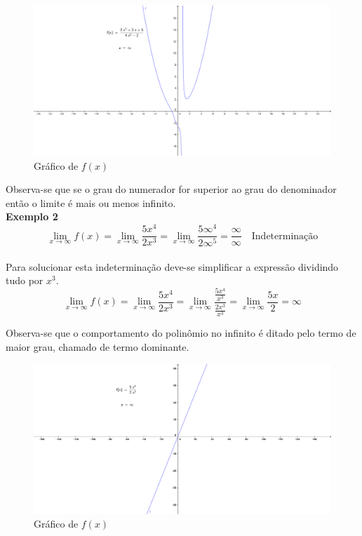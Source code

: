 \begin{figure}[H]
\centering %
\includegraphics[width=15cm]{img/graph9.png} %
\caption{Gráfico de $ f(x)$}
\label{fig:graph9}
\end{figure}

Observa-se que se o grau do numerador for superior ao grau do denominador então o limite é mais ou menos infinito.\\
 

\textbf{Exemplo 2} $$\displaystyle  \lim_{x \to \infty}f(x) = \lim_{x \to \infty} \frac{5x^4}{2x^3} = \lim_{x \to \infty} \frac{5 \infty^4}{2 \infty^5} = \frac{\infty}{\infty} \quad \textrm{Indeterminação}$$\\
Para solucionar esta indeterminação deve-se simplificar a expressão dividindo tudo por $x^3$.
$$
\lim_{x \to \infty}f(x) = \lim_{x \to \infty} \frac{5x^4}{2x^3} = \lim_{x \to \infty} \frac{\frac{5x^4}{x^3}}{\frac{2x^3}{x^3}} = \lim_{x \to \infty} \frac{5x}{2} = \infty
$$

Observa-se que o comportamento do polinômio no infinito é ditado pelo termo de maior grau, chamado de termo dominante.\\
\begin{figure}[H]
\centering %
\includegraphics[width=15cm]{img/graph10.png} %
\caption{Gráfico de $f(x)$}
\label{fig:graph10}
\end{figure}

